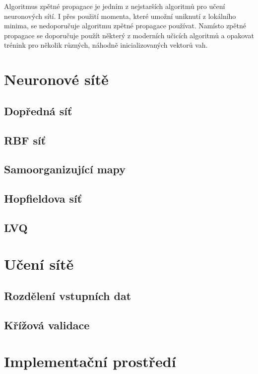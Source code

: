 \documentclass[11pt,twoside,a4paper]{book}
\begin{document}
Algoritmus zpětné propagace je jedním z nejstarších algoritmů pro učení neuronových sítí. I přes použití momenta, které umožní uniknutí z lokálního minima, se nedoporučuje algoritmu zpětné propagace používat. Namísto zpětné propagace se doporučuje použít některý z moderních učicích algoritmů a opakovat trénink pro několik různých, náhodně inicializovaných vektorů vah.\cite{nndocumentation}
\chapter{Neuronové sítě}
\section{Dopředná síť}
\section{RBF síť}
\section{Samoorganizující mapy}
\section{Hopfieldova síť}
\section{LVQ}
\chapter{Učení sítě}
\section{Rozdělení vstupních dat}
\section{Křížová validace}

\chapter{Implementační prostředí}
\end{document}

